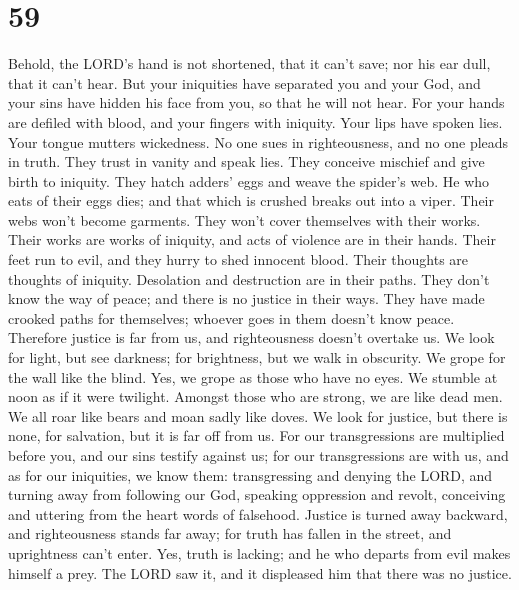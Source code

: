 \hypertarget{section-56}{%
\section{59}\label{section-56}}

 Behold, the LORD's hand is not shortened, that it can't
save; nor his ear dull, that it can't hear.  But your
iniquities have separated you and your God, and your sins have hidden
his face from you, so that he will not hear.  For your
hands are defiled with blood, and your fingers with iniquity. Your lips
have spoken lies. Your tongue mutters wickedness.  No one
sues in righteousness, and no one pleads in truth. They trust in vanity
and speak lies. They conceive mischief and give birth to iniquity.
 They hatch adders' eggs and weave the spider's web. He
who eats of their eggs dies; and that which is crushed breaks out into a
viper.  Their webs won't become garments. They won't cover
themselves with their works. Their works are works of iniquity, and acts
of violence are in their hands.  Their feet run to evil,
and they hurry to shed innocent blood. Their thoughts are thoughts of
iniquity. Desolation and destruction are in their paths. 
They don't know the way of peace; and there is no justice in their ways.
They have made crooked paths for themselves; whoever goes in them
doesn't know peace.  Therefore justice is far from us, and
righteousness doesn't overtake us. We look for light, but see darkness;
for brightness, but we walk in obscurity.  We grope for
the wall like the blind. Yes, we grope as those who have no eyes. We
stumble at noon as if it were twilight. Amongst those who are strong, we
are like dead men.  We all roar like bears and moan sadly
like doves. We look for justice, but there is none, for salvation, but
it is far off from us.  For our transgressions are
multiplied before you, and our sins testify against us; for our
transgressions are with us, and as for our iniquities, we know them:
 transgressing and denying the LORD, and turning away
from following our God, speaking oppression and revolt, conceiving and
uttering from the heart words of falsehood.  Justice is
turned away backward, and righteousness stands far away; for truth has
fallen in the street, and uprightness can't enter.  Yes,
truth is lacking; and he who departs from evil makes himself a prey. The
LORD saw it, and it displeased him that there was no justice.
